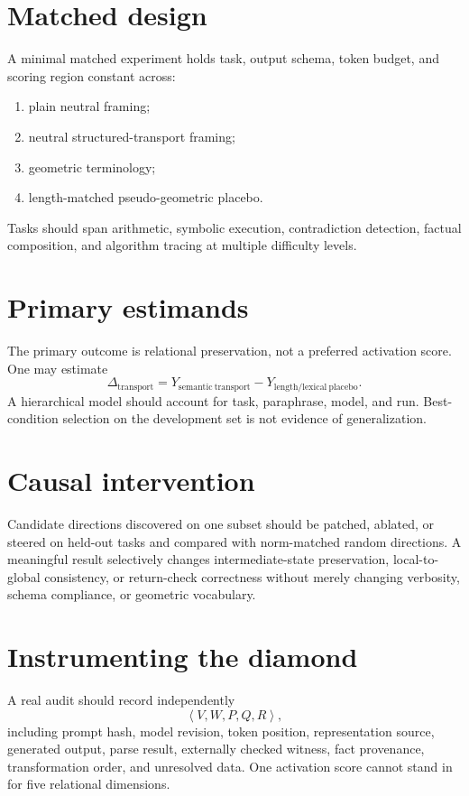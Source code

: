 \documentclass[12pt,openany]{book}
\theoremstyle{remark}
\newcommand{\typedtuple}[1]{\left\langle #1 \right\rangle}
\begin{document}
\section{Matched design}
A minimal matched experiment holds task, output schema, token budget, and scoring region constant across:
\begin{enumerate}
\item plain neutral framing;
\item neutral structured-transport framing;
\item geometric terminology;
\item length-matched pseudo-geometric placebo.
\end{enumerate}
Tasks should span arithmetic, symbolic execution, contradiction detection, factual composition, and algorithm tracing at multiple difficulty levels.

\section{Primary estimands}
The primary outcome is relational preservation, not a preferred activation score. One may estimate
\[
\Delta_{\mathrm{transport}}
=
Y_{\mathrm{semantic\ transport}}
-
Y_{\mathrm{length/lexical\ placebo}}.
\]
A hierarchical model should account for task, paraphrase, model, and run. Best-condition selection on the development set is not evidence of generalization.

\section{Causal intervention}
Candidate directions discovered on one subset should be patched, ablated, or steered on held-out tasks and compared with norm-matched random directions. A meaningful result selectively changes intermediate-state preservation, local-to-global consistency, or return-check correctness without merely changing verbosity, schema compliance, or geometric vocabulary.

\section{Instrumenting the diamond}
A real audit should record independently
\[
\typedtuple{V,W,P,Q,R},
\]
including prompt hash, model revision, token position, representation source, generated output, parse result, externally checked witness, fact provenance, transformation order, and unresolved data. One activation score cannot stand in for five relational dimensions.
\end{document}
